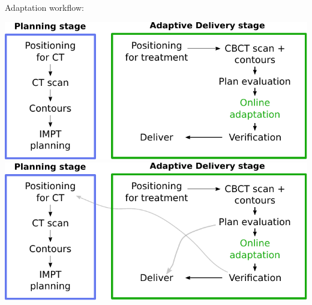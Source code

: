 \begin{frame}[c]{Adaptation workflow:}
    \begin{overprint}
    \includegraphics[scale=0.86]{imgs/workflow_adaptive_1.pdf}
    \includegraphics[scale=0.86]{imgs/workflow_adaptive_2.pdf}
    \end{overprint}
\end{frame}

